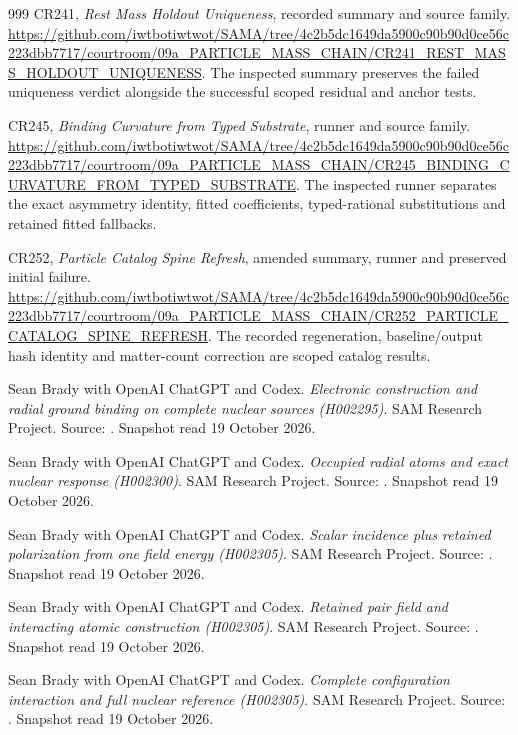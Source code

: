 \begin{thebibliography}{999}
CR241, \emph{Rest Mass Holdout Uniqueness}, recorded summary and source family.
\url{https://github.com/iwtbotiwtwot/SAMA/tree/4c2b5dc1649da5900c90b90d0ce56c223dbb7717/courtroom/09a_PARTICLE_MASS_CHAIN/CR241_REST_MASS_HOLDOUT_UNIQUENESS}.
The inspected summary preserves the failed uniqueness verdict alongside the successful scoped residual and anchor tests.

CR245, \emph{Binding Curvature from Typed Substrate}, runner and source family.
\url{https://github.com/iwtbotiwtwot/SAMA/tree/4c2b5dc1649da5900c90b90d0ce56c223dbb7717/courtroom/09a_PARTICLE_MASS_CHAIN/CR245_BINDING_CURVATURE_FROM_TYPED_SUBSTRATE}.
The inspected runner separates the exact asymmetry identity, fitted coefficients, typed-rational substitutions and retained fitted fallbacks.

CR252, \emph{Particle Catalog Spine Refresh}, amended summary, runner and preserved initial failure.
\url{https://github.com/iwtbotiwtwot/SAMA/tree/4c2b5dc1649da5900c90b90d0ce56c223dbb7717/courtroom/09a_PARTICLE_MASS_CHAIN/CR252_PARTICLE_CATALOG_SPINE_REFRESH}.
The recorded regeneration, baseline/output hash identity and matter-count correction are scoped catalog results.


 Sean Brady with OpenAI ChatGPT and Codex. \emph{Electronic construction and radial ground binding on complete nuclear sources (H002295)}. SAM Research Project. Source: . Snapshot read 19 October 2026.

 Sean Brady with OpenAI ChatGPT and Codex. \emph{Occupied radial atoms and exact nuclear response (H002300)}. SAM Research Project. Source: . Snapshot read 19 October 2026.

 Sean Brady with OpenAI ChatGPT and Codex. \emph{Scalar incidence plus retained polarization from one field energy (H002305)}. SAM Research Project. Source: . Snapshot read 19 October 2026.

 Sean Brady with OpenAI ChatGPT and Codex. \emph{Retained pair field and interacting atomic construction (H002305)}. SAM Research Project. Source: . Snapshot read 19 October 2026.

 Sean Brady with OpenAI ChatGPT and Codex. \emph{Complete configuration interaction and full nuclear reference (H002305)}. SAM Research Project. Source: . Snapshot read 19 October 2026.


\end{thebibliography}
